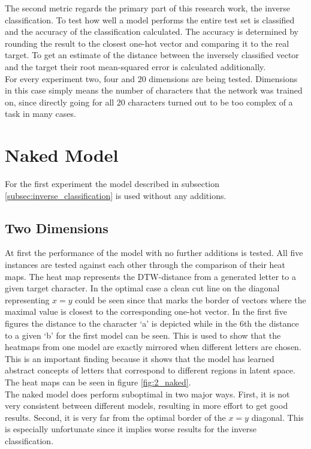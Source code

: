 	The second metric regards the primary part of this research work, the inverse classification. To test how well a model performs the entire test set is classified and the accuracy of the classification calculated. The accuracy is determined by rounding the result to the closest one-hot vector and comparing it to the real target. To get an estimate of the distance between the inversely classified vector and the target their root mean-squared error is calculated additionally. \\
	For every experiment two, four and 20 dimensions are being tested. Dimensions in this case simply means the number of characters that the network was trained on, since directly going for all 20 characters turned out to be too complex of a task in many cases. 
	
\section{Naked Model}

For the first experiment the model described in subsection \ref{subsec:inverse_classification}
is used without any additions. 

\subsection{Two Dimensions}

At first the performance of the model with no further additions is tested. All five instances are tested against each other through the comparison of their heat maps. The heat map represents the DTW-distance from a generated letter to a given target character. In the optimal case a clean cut line on the diagonal representing $x=y$ could be seen since that marks the border of vectors where  the maximal value is closest to the corresponding one-hot vector. In the first five figures the distance to the character `a' is depicted while in the 6th the distance to a given `b' for the first model can be seen. This is used to show that the heatmaps from one model are exactly mirrored when different letters are chosen. This is an important finding because it shows that the model has learned abstract concepts of letters that correspond to different regions in latent space. The heat maps can be seen in figure \ref{fig:2_naked}. \\ 
The naked model does perform suboptimal in two major ways. First, it is not very consistent between different models, resulting in more effort to get good results. Second, it is very far from the optimal border of the $x=y$ diagonal. This is especially unfortunate since it implies worse results for the inverse classification.  

